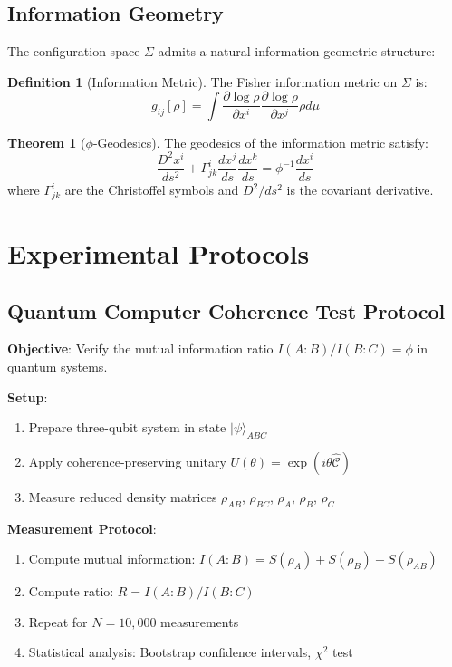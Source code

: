 \documentclass[11pt]{article}
\theoremstyle{definition}
\newtheorem{theorem}{Theorem}[section]
\newtheorem{definition}{Definition}[section]
\newcommand{\goldenratio}{\phi}
\newcommand{\coherence}{\mathcal{C}}
\newcommand{\configspace}{\Sigma}
\newcommand{\density}{\rho}
\begin{document}
\subsection{Information Geometry}

The configuration space $\configspace$ admits a natural information-geometric structure:

\begin{definition}[Information Metric]
The Fisher information metric on $\configspace$ is:
\begin{equation}
g_{ij}[\density] = \int \frac{\partial \log \density}{\partial x^i} \frac{\partial \log \density}{\partial x^j} \density d\mu
\end{equation}
\end{definition}

\begin{theorem}[$\goldenratio$-Geodesics]
The geodesics of the information metric satisfy:
\begin{equation}
\frac{D^2 x^i}{ds^2} + \Gamma^i_{jk} \frac{dx^j}{ds} \frac{dx^k}{ds} = \goldenratio^{-1} \frac{dx^i}{ds}
\end{equation}
where $\Gamma^i_{jk}$ are the Christoffel symbols and $D^2/ds^2$ is the covariant derivative.
\end{theorem}

\section{Experimental Protocols}

\subsection{Quantum Computer Coherence Test Protocol}

\textbf{Objective}: Verify the mutual information ratio $I(A:B)/I(B:C) = \goldenratio$ in quantum systems.

\textbf{Setup}:
\begin{enumerate}
\item Prepare three-qubit system in state $|\psi\rangle_{ABC}$
\item Apply coherence-preserving unitary $U(\theta) = \exp(i\theta \hat{\coherence})$
\item Measure reduced density matrices $\rho_{AB}$, $\rho_{BC}$, $\rho_A$, $\rho_B$, $\rho_C$
\end{enumerate}

\textbf{Measurement Protocol}:
\begin{enumerate}
\item Compute mutual information: $I(A:B) = S(\rho_A) + S(\rho_B) - S(\rho_{AB})$
\item Compute ratio: $R = I(A:B)/I(B:C)$
\item Repeat for $N = 10,000$ measurements
\item Statistical analysis: Bootstrap confidence intervals, $\chi^2$ test
\end{enumerate}
\end{document}
